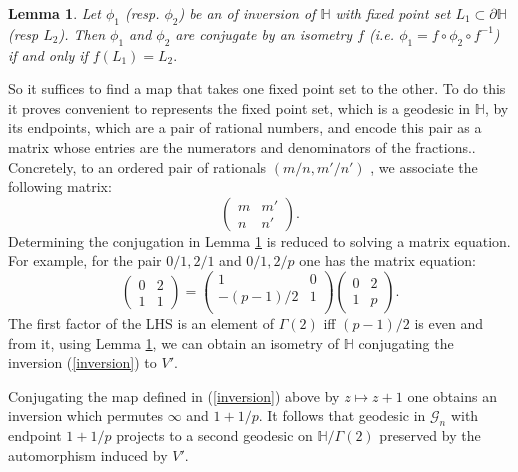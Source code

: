 \documentclass[12pt,a4paper]{amsart}
\newtheorem{lem}[thm]{Lemma}
\def\HH{\mathbb{H}}
\def\dHH{\partial \mathbb{H}}
\def\xx{\HH/g2}
\def\g2{\Gamma(2)}
\def\xx{\HH/\g2}
\def\gg{\mathcal{G}_n}
\begin{document}
\begin{lem}\label{fps}
Let $\phi_1$ (resp. $\phi_2$)
 be an of inversion of $\HH$ with fixed point set
  $L_1  \subset \dHH$ (resp $L_2$).
Then $\phi_1$ and $\phi_2$
  are conjugate by an isometry  $f$ 
  (i.e. $\phi_1 = f\circ \phi_2 \circ f^{-1}$)
  if and only if $ f(L_1) = L_2.$
\end{lem} 
So it suffices to find a  map that takes one fixed point set to the other.
To do this it proves convenient to represents the fixed point set, 
which is a geodesic in $\HH$,
by its endpoints, which are a pair of rational numbers,
and encode this pair as a matrix 
whose entries are  the numerators and denominators of the fractions..
Concretely, to an ordered  pair of rationals  $(m/n, m'/n')$ , 
 we associate the following matrix:
$$\begin{pmatrix}
m & m'\\
n & n'
\end{pmatrix}.
$$
Determining the  conjugation in Lemma \ref{fps}
is reduced to solving a matrix equation.
For example, for the pair $0/1, 2/1$  and  $0/1, 2/p$   one has the matrix equation:
\begin{equation}
\begin{pmatrix}
0 & 2\\
1 & 1
\end{pmatrix}
= 
\begin{pmatrix}
1 & 0 \\
 -(p-1)/2& 1\\
\end{pmatrix}
\begin{pmatrix}
0& 2\\
1 & p
\end{pmatrix}.
\end{equation}
The first factor of the LHS is an element of $\g2$ iff $(p-1)/2$ is even
 and from it, using Lemma \ref{fps}, we can obtain an isometry of
$\HH$ conjugating the inversion (\ref{inversion}) to $V'$.

Conjugating the map defined in (\ref{inversion}) above
by $z \mapsto z + 1$ 
one obtains an inversion 
which permutes $\infty$ and  $1 + 1/p$.
It follows that  geodesic in $\gg$ with endpoint $1 + 1/p$ 
projects to a second geodesic on $\xx$
preserved by the automorphism induced by $V'$.

\end{document}
